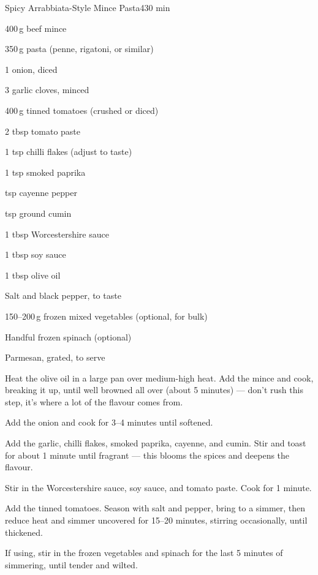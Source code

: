 \begin{recipebox}{Spicy Arrabbiata-Style Mince Pasta}{4}{30 min}
  \begin{ingredients}
    \item 400\,g beef mince
    \item 350\,g pasta (penne, rigatoni, or similar)
    \item 1 onion, diced
    \item 3 garlic cloves, minced
    \item 400\,g tinned tomatoes (crushed or diced)
    \item 2 tbsp tomato paste
    \item 1 tsp chilli flakes (adjust to taste)
    \item 1 tsp smoked paprika
    \item {} tsp cayenne pepper
    \item {} tsp ground cumin
    \item 1 tbsp Worcestershire sauce
    \item 1 tbsp soy sauce
    \item 1 tbsp olive oil
    \item Salt and black pepper, to taste
    \item 150--200\,g frozen mixed vegetables (optional, for bulk)
    \item Handful frozen spinach (optional)
    \item Parmesan, grated, to serve
  \end{ingredients}
  \begin{method}
    \item Heat the olive oil in a large pan over medium-high heat. Add the mince and cook, breaking it up, until well browned all over (about 5 minutes) --- don't rush this step, it's where a lot of the flavour comes from.
    \item Add the onion and cook for 3--4 minutes until softened.
    \item Add the garlic, chilli flakes, smoked paprika, cayenne, and cumin. Stir and toast for about 1 minute until fragrant --- this blooms the spices and deepens the flavour.
    \item Stir in the Worcestershire sauce, soy sauce, and tomato paste. Cook for 1 minute.
    \item Add the tinned tomatoes. Season with salt and pepper, bring to a simmer, then reduce heat and simmer uncovered for 15--20 minutes, stirring occasionally, until thickened.
    \item If using, stir in the frozen vegetables and spinach for the last 5 minutes of simmering, until tender and wilted.

\end{method}
\end{recipebox}

